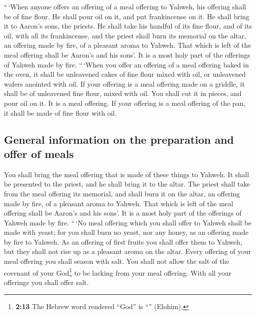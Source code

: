  ``\,`When anyone offers an offering of a meal offering to
Yahweh, his offering shall be of fine flour. He shall pour oil on it,
and put frankincense on it.  He shall bring it to Aaron's
sons, the priests. He shall take his handful of its fine flour, and of
its oil, with all its frankincense, and the priest shall burn its
memorial on the altar, an offering made by fire, of a pleasant aroma to
Yahweh.  That which is left of the meal offering shall be
Aaron's and his sons'. It is a most holy part of the offerings of Yahweh
made by fire.  ``\,`When you offer an offering of a meal
offering baked in the oven, it shall be unleavened cakes of fine flour
mixed with oil, or unleavened wafers anointed with oil. 
If your offering is a meal offering made on a griddle, it shall be of
unleavened fine flour, mixed with oil.  You shall cut it
in pieces, and pour oil on it. It is a meal offering.  If
your offering is a meal offering of the pan, it shall be made of fine
flour with oil.

\hypertarget{general-information-on-the-preparation-and-offer-of-meals}{%
\subsection{General information on the preparation and offer of
meals}\label{general-information-on-the-preparation-and-offer-of-meals}}

 You shall bring the meal offering that is made of these
things to Yahweh. It shall be presented to the priest, and he shall
bring it to the altar.  The priest shall take from the
meal offering its memorial, and shall burn it on the altar, an offering
made by fire, of a pleasant aroma to Yahweh.  That which
is left of the meal offering shall be Aaron's and his sons'. It is a
most holy part of the offerings of Yahweh made by fire. 
``\,`No meal offering which you shall offer to Yahweh shall be made with
yeast; for you shall burn no yeast, nor any honey, as an offering made
by fire to Yahweh.  As an offering of first fruits you
shall offer them to Yahweh, but they shall not rise up as a pleasant
aroma on the altar.  Every offering of your meal offering
you shall season with salt. You shall not allow the salt of the covenant
of your God\footnote{\textbf{2:13} The Hebrew word rendered ``God'' is
  ``'' (Elohim).} to be lacking from your meal offering.
With all your offerings you shall offer salt.

